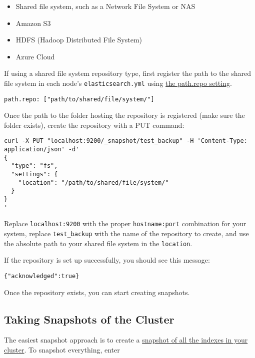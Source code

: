 \begin{itemize}
\tightlist
\item
  Shared file system, such as a Network File System or NAS
\item
  Amazon S3
\item
  HDFS (Hadoop Distributed File System)
\item
  Azure Cloud
\end{itemize}

If using a shared file system repository type, first register the path
to the shared file system in each node's \texttt{elasticsearch.yml}
using
\href{https://www.elastic.co/guide/en/elasticsearch/reference/6.5/modules-snapshots.html\#_shared_file_system_repository}{the
path.repo setting}.

\begin{verbatim}
path.repo: ["path/to/shared/file/system/"]
\end{verbatim}

Once the path to the folder hosting the repository is registered (make
sure the folder exists), create the repository with a PUT command:

\begin{verbatim}
curl -X PUT "localhost:9200/_snapshot/test_backup" -H 'Content-Type: application/json' -d'
{
  "type": "fs",
  "settings": {
    "location": "/path/to/shared/file/system/"
  }
}
'
\end{verbatim}

Replace \texttt{localhost:9200} with the proper \texttt{hostname:port}
combination for your system, replace \texttt{test\_backup} with the name
of the repository to create, and use the absolute path to your shared
file system in the \texttt{location}.

If the repository is set up successfully, you should see this message:

\begin{verbatim}
{"acknowledged":true}
\end{verbatim}

Once the repository exists, you can start creating snapshots.

\subsection{Taking Snapshots of the
Cluster}\label{taking-snapshots-of-the-cluster}

The easiest snapshot approach is to create a
\href{https://www.elastic.co/guide/en/elasticsearch/reference/6.5/modules-snapshots.html\#_snapshot}{snapshot
of all the indexes in your cluster}. To snapshot everything, enter

